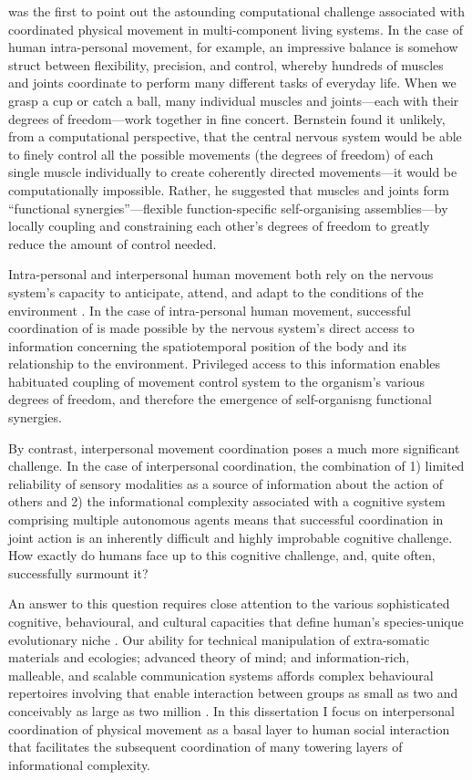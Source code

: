 \begin{CJK}{UTF8}{gbsn}
\textcite{Bernstein1967} was the first to point out the astounding computational challenge associated with coordinated physical movement in multi-component living systems.  In the case of human intra-personal movement, for example, an impressive balance is somehow struct between flexibility, precision, and control, whereby hundreds of muscles and joints coordinate to perform many different tasks of everyday life.  When we grasp a cup or catch a ball, many individual muscles and joints---each with their degrees of freedom---work together in fine concert.  Bernstein found it unlikely, from a computational perspective, that the central nervous system would be able to finely control all the possible movements (the degrees of freedom) of each single muscle individually to create coherently directed movements---it would be computationally impossible.  Rather, he suggested that muscles and joints form  ``functional synergies''---flexible function-specific self-organising assemblies---by locally coupling and constraining each other’s degrees of freedom to greatly reduce the amount of control needed.

Intra-personal and interpersonal human movement both rely on the nervous system’s capacity to anticipate, attend, and adapt to the conditions of the environment \citep{Keller2014}.  In the case of intra-personal human movement, successful coordination of is made possible by the nervous system's direct access to information concerning the spatiotemporal position of the body and its relationship to the environment.  Privileged access to this information enables habituated coupling of movement control system to the organism's various degrees of freedom, and therefore the emergence of self-organisng functional synergies.

By contrast, interpersonal movement coordination poses a much more significant challenge.  In the case of interpersonal coordination, the combination of 1) limited reliability of sensory modalities as a source of information about the action of others \citep{Wilson2005,Wolpert2003,Frith2007} and 2) the informational complexity associated with a cognitive system comprising multiple autonomous agents \citep{Bernstein1967} means that successful coordination in joint action is an inherently difficult and highly improbable cognitive challenge.  How exactly do humans face up to this cognitive challenge, and, quite often, successfully surmount it?

An answer to this question requires close attention to the various sophisticated cognitive, behavioural, and cultural capacities that define human's species-unique evolutionary niche \citep{Roepstorff2010,Clark2015,Fuentes2016}. Our ability for technical manipulation of extra-somatic materials and ecologies; advanced theory of mind; and information-rich, malleable, and scalable communication systems affords complex behavioural repertoires involving that enable interaction between groups as small as two and conceivably as large as two million \citep{Nowak2017}.  In this dissertation I focus on interpersonal coordination of physical movement as a basal layer to human social interaction that facilitates the subsequent coordination of many towering layers of informational complexity.


\end{CJK}

